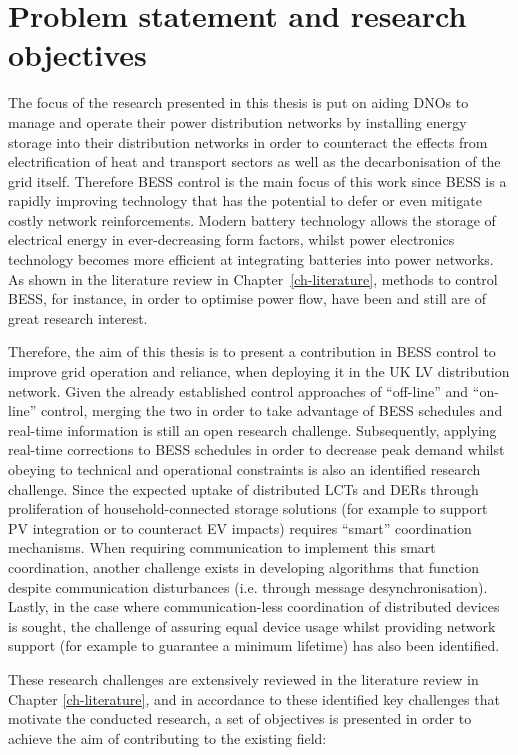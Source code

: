 \section{Problem statement and research objectives}
\label{ch-introduction:sec:problem-statement}

The focus of the research presented in this thesis is put on aiding DNOs to manage and operate their power distribution networks by installing energy storage into their distribution networks in order to counteract the effects from electrification of heat and transport sectors as well as the decarbonisation of the grid itself.
Therefore BESS control is the main focus of this work since BESS is a rapidly improving technology that has the potential to defer or even mitigate costly network reinforcements.
Modern battery technology allows the storage of electrical energy in ever-decreasing form factors, whilst power electronics technology becomes more efficient at integrating batteries into power networks.
As shown in the literature review in Chapter~\ref{ch-literature}, methods to control BESS, for instance, in order to optimise power flow, have been and still are of great research interest.

Therefore, the aim of this thesis is to present a contribution in BESS control to improve grid operation and reliance, when deploying it in the UK LV distribution network.
Given the already established control approaches of ``off-line'' and ``on-line'' control, merging the two in order to take advantage of BESS schedules and real-time information is still an open research challenge.
Subsequently, applying real-time corrections to BESS schedules in order to decrease peak demand whilst obeying to technical and operational constraints is also an identified research challenge.
Since the expected uptake of distributed LCTs and DERs through proliferation of household-connected storage solutions (for example to support PV integration or to counteract EV impacts) requires ``smart'' coordination mechanisms.
When requiring communication to implement this smart coordination, another challenge exists in developing algorithms that function despite communication disturbances (i.e. through message desynchronisation).
Lastly, in the case where communication-less coordination of distributed devices is sought, the challenge of assuring equal device usage whilst providing network support (for example to guarantee a minimum lifetime) has also been identified.

These research challenges are extensively reviewed in the literature review in Chapter \ref{ch-literature}, and in accordance to these identified key challenges that motivate the conducted research, a set of objectives is presented in order to achieve the aim of contributing to the existing field:

